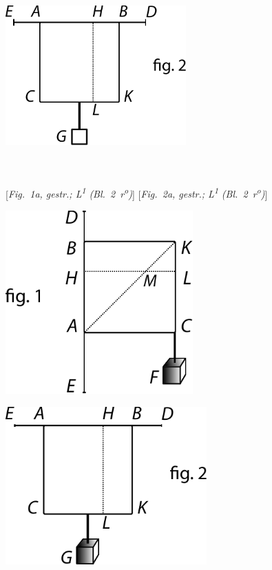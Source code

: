 \hspace{5mm}
\begin{minipage}[t]{0.5\textwidth}
\includegraphics[width=0.52\textwidth]{gesamttex/edit_VIII,3/images/dnr-2a_LH_35_09_16_002-003_d2a.pdf}
\end{minipage}
\\
\\
\hspace*{8mm} [\textit{Fig.~1a, gestr.; L\textsuperscript{1}\! (Bl.~2~r\textsuperscript{o}\!)}]\hspace*{24mm} [\textit{Fig.~2a, gestr.; L\textsuperscript{1}\! (Bl.~2~r\textsuperscript{o}\!)}]\label{LH_35_09_16_002r_Fig_1+2}
\pend
\vspace{1.5em}
\pstart 
\hspace{6mm}\begin{minipage}[t]{0.5\textwidth}
\includegraphics[width=0.54\textwidth]{gesamttex/edit_VIII,3/images/dnr-1b_AE_1684_319-325_d1b.pdf}
\end{minipage}
\hspace{-2mm}
\begin{minipage}[t]{0.5\textwidth}
\includegraphics[width=0.58\textwidth]{gesamttex/edit_VIII,3/images/dnr-2b_AE_1684_319-325_d2b.pdf}
\end{minipage}
